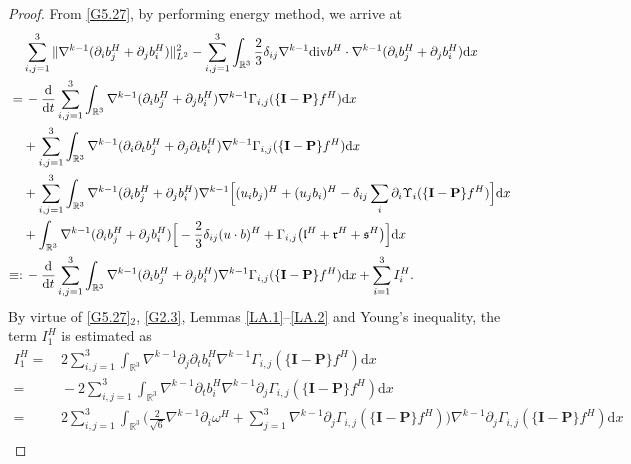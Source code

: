 \documentclass[reqno,11pt]{amsart}
\theoremstyle{plain}
\numberwithin{equation}{section}
\begin{document}
\begin{proof}
From \eqref{G5.27}, by  performing energy method, we arrive at 
\begin{align}\label{G5.30}
& \sum_{i, j=1}^3  \|\nabla^{k-1} (\partial_i b^H_j+\partial_j b^H_i ) \|_{L^2}^2-\sum_{i, j=1}^3 \int_{\mathbb{R}^3} \frac{2}{3} \delta_{i j} \nabla^{k-1} {\rm div}  b^H\cdot \nabla^{k-1} (\partial_i b^H_j+\partial_j b^H_i ) \mathrm{d} x \nonumber\\
=&\, -\frac{\mathrm{d}}{\mathrm{d} t} \sum_{i, j=1}^3 \int_{\mathbb{R}^3}\nabla^{k-1} (\partial_i b^H_j+\partial_j b^H_i) \nabla^{k-1} \Gamma_{i, j}(\{\mathbf{I}-\mathbf{P}\} f^H) \mathrm{d} x \nonumber\\
&   +\sum_{i, j=1}^3 \int_{\mathbb{R}^3} \nabla^{k-1} (\partial_i \partial_t b^H_j+\partial_j \partial_t b^H_i ) \nabla^{k-1} \Gamma_{i, j}(\{\mathbf{I}-\mathbf{P}\} f^H) \mathrm{d} x \nonumber\\
&   +\sum_{i, j=1}^3 \int_{\mathbb{R}^3} \nabla^{k-1} (\partial_i b^H_j+\partial_j b^H_i ) \nabla^{k-1}\Big[ (u_i b_j)^H+(u_j b_i )^H-\delta_{i j}\sum_i \partial_i \Upsilon_i(\{\mathbf{I}-\mathbf{P}\} f^H)\Big]\mathrm{d}x\nonumber \\
&  +\int_{\mathbb{R}^3}\nabla^{k-1} (\partial_i b^H_j+\partial_j b^H_i )\Big[-\frac{2}{3}\delta_{i j} (u \cdot b)^H+\Gamma_{i, j}\big(\mathfrak{l}^H+\mathfrak{r}^H+\mathfrak{s}^H\big)\Big] \mathrm{d} x \nonumber\\
\equiv:&\,-\frac{\mathrm{d}}{\mathrm{d} t} \sum_{i, j=1}^3 \int_{\mathbb{R}^3}\nabla^{k-1} (\partial_i b^H_j+\partial_j b^H_i) \nabla^{k-1} \Gamma_{i, j}(\{\mathbf{I}-\mathbf{P}\} f^H) \mathrm{d} x
+\sum_{i=1}^3I_i^H.
\end{align}
By virtue of \eqref{G5.27}$_2$, \eqref{G2.3}, Lemmas \ref{LA.1}--\ref{LA.2} 
and Young's inequality, the term ${I}^H_1$ is estimated as %
\begin{align}\label{G5.31}
{I}^H_1=&\, 2\sum_{i, j=1}^3 \int_{\mathbb{R}^3}   \nabla^{k-1}\partial_j \partial_t {b}_i^H   \nabla^{k-1}\Gamma_{i, j}(\{\mathbf{I}-\mathbf{P}\} {f}^H) \mathrm{d} x\nonumber\\
=&\,  -2\sum_{i, j=1}^3 \int_{\mathbb{R}^3}   \nabla^{k-1} \partial_t {b}^H_i   \nabla^{k-1}\partial_j\Gamma_{i, j}(\{\mathbf{I}-\mathbf{P}\} {f}^H) \mathrm{d} x\nonumber\\
=&\,2\sum_{i, j=1}^3 \int_{\mathbb{R}^3} \Big( \frac{2}{\sqrt{6}} \nabla^{k-1}\partial_i \omega^H+\sum_{j=1}^3 \nabla^{k-1}\partial_{j} \Gamma_{i, j}(\{\mathbf{I}-\mathbf{P}\} {f}^H)\Big)\nabla^{k-1}\partial_j\Gamma_{i, j}(\{\mathbf{I}-\mathbf{P}\} {f}^H) \mathrm{d} x\nonumber\\

\end{align}
\end{proof}
\end{document}
